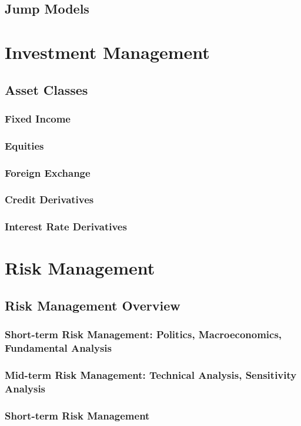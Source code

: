 \section{Jump Models}



\chapter{Investment Management}
\section{Asset Classes}
\subsection{Fixed Income}
\subsection{Equities}
\subsection{Foreign Exchange}
\subsection{Credit Derivatives}
\subsection{Interest Rate Derivatives}

\chapter{Risk Management}
\section{Risk Management Overview}
\subsection{Short-term Risk Management: Politics, Macroeconomics, Fundamental Analysis}
\subsection{Mid-term Risk Management: Technical Analysis, Sensitivity Analysis}
\subsection{Short-term Risk Management}

